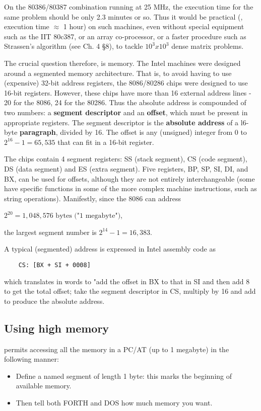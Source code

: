 On the 80386/80387 combination running at 25 MHz, the execution time for the same problem should be only 2.3 minutes or so. Thus it would be practical (\ie, execution time $\approx$ 1 hour) on such machines, even without special equipment such as the IIT 80c387, or an array co-processor, or a faster procedure such as Strassen's algorithm (see Ch. 4 \S8), to tackle $10^{3} x 10^{3}$ dense matrix problems.

The crucial question therefore, is memory. The Intel machines were designed around a segmented memory architecture. That is, to avoid having to use (expensive) 32-bit address registers, the 8086/80286 chips were designed to use 16-bit registers. However, these chips have more than 16 external address lines - 20 for the 8086, 24 for the 80286. Thus the absolute address is compounded of two numbers: a \textbf{segment descriptor} and an \textbf{offset}, which must be present in appropriate registers. The segment descriptor is the \textbf{absolute address} of a l6-byte \textbf{paragraph}, divided by 16. The offset is any (unsigned) integer from 0 to $2^{16}-1 = 65,535$ that can fit in a 16-bit register.

The chips contain 4 segment registers: SS (stack segment), CS (code segment), DS (data segment) and ES (extra segment). Five registers, BP, SP, SI, DI, and BX, can be used for offsets, although they are not entirely interchangeable (some have specific functions in some of the more complex machine instructions, such as string operations). Manifestly, since the 8086 can address

$2^{20} = 1,048,576 \textrm{ bytes ("1 megabyte")}$,

the largest segment number is $2^{14}-1 = 16,383$.

A typical (segmented) address is expressed in Intel assembly code
as

\begin{lstlisting}
    CS: [BX + SI + 0008]
\end{lstlisting}

which translates in words to "add the offset in BX to that in SI and then add 8 to get the total offset; take the segment descriptor in CS, multiply by 16 and add to produce the absolute address.

\subsection{Using high memory}
 permits accessing all the memory in a PC/AT (up
to 1 megabyte) in the following manner:
\begin{itemize}
    \item Define a named segment of length 1 byte: this marks the beginning of available memory.
    \item Then tell both FORTH and DOS how much memory you want.
\end{itemize} 

